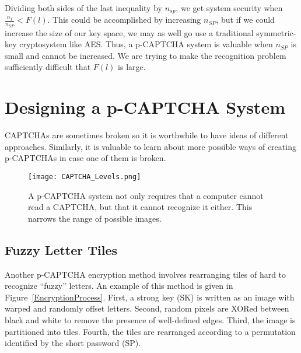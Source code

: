 \documentclass[12pt]{article}
\begin{document}
Dividing both sides of the last inequality by $n_{sp}$, we get system security when $\frac{n_f}{n_{SP}} < F(l)$. This could be accomplished by increasing $n_{SP}$, but if we could increase the size of our key space, we may as well go use a traditional symmetric-key cryptosystem like AES. Thus, a p-CAPTCHA system is valuable when $n_{SP}$ is small and cannot be increased. We are trying to make the recognition problem sufficiently difficult that $F(l)$ is large.

\section*{Designing a p-CAPTCHA System}

CAPTCHAs are sometimes broken so it is worthwhile to have ideas of different approaches. Similarly, it is valuable to learn about more possible ways of creating p-CAPTCHAs in case one of them is broken. 

\begin{figure}
	\begin{center}
		\texttt{[image: CAPTCHA\_Levels.png]}
	\end{center}
	\caption{A p-CAPTCHA system not only requires that a computer cannot read a CAPTCHA, but that it cannot recognize it either. This narrows the range of possible images.}
\label{CAPTCHALevels}
\end{figure}





\subsection*{Fuzzy Letter Tiles}
	Another p-CAPTCHA encryption method involves rearranging tiles of hard to recognize “fuzzy” letters. An example of this method is given in Figure~{\ref{EncryptionProcess}}. First, a strong key (SK) is written as an image with warped and randomly offset letters. Second, random pixels are XORed between black and white to remove the presence of well-defined edges. Third, the image is partitioned into tiles. Fourth, the tiles are rearranged according to a permutation identified by the short password (SP).
\end{document}
